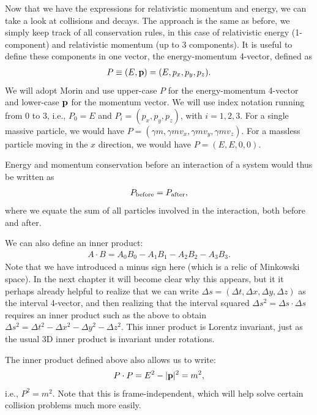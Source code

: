 \documentclass[12pt]{article}
\newcommand{\be}{\begin{eqnarray}}
\newcommand{\ee}{\end{eqnarray}}
\begin{document}
Now that we have the expressions for relativistic momentum and energy, we can take a look at collisions and decays.  The approach is the same as before, we simply keep track of all conservation rules, in this case of relativistic energy (1-component) and relativistic momentum (up to 3 components). It is useful to define these components in one vector, the energy-momentum 4-vector, defined as 
\be
P \equiv (E, {\bf p}) = (E,p_x, p_y, p_z).
\ee
We will adopt Morin and use upper-case $P$ for the energy-momentum 4-vector and lower-case ${\bf p}$ for the momentum vector. We will use index notation running from $0$ to $3$, i.e., $P_0 = E$ and $P_i = (p_x, p_y, p_z)$, with $i=1,2,3$. For a single massive particle, we would have $P=(\gamma m,\gamma mv_x, \gamma m v_y, \gamma m v_z)$. For a massless particle moving in the $x$ direction, we would have $P=(E,E,0,0)$. 

Energy and momentum conservation before an interaction of a system would thus be written as 
\be
P_{\rm before} = P_{\rm after},
\ee
where we equate the sum of all particles involved in the interaction, both before and after. 

We can also define an inner product:
\be
A\cdot B = A_0 B_0 - A_1 B_1 - A_2 B_2 -A_3 B_3. 
\ee
Note that we have introduced a minus sign here (which is a relic of Minkowski space). In the next chapter it will become clear why this appears, but it it perhaps already helpful to realize that we can write $\Delta s = (\Delta t, \Delta x, \Delta y, \Delta z)$ as the interval 4-vector, and then realizing that the interval squared $\Delta s^2 = \Delta s \cdot \Delta s$ requires an inner product such as the above to obtain $\Delta s^2 = \Delta t^2 - \Delta x^2 - \Delta y^2 - \Delta z^2$. This inner product is Lorentz invariant, just as the usual 3D inner product is invariant under rotations. 

The inner product defined above also allows us to write:
\be
P \cdot P = E^2 - |{\bf p}|^2 = m^2,
\ee
i.e., $P^2 = m^2$. Note that this is frame-independent, which will help solve certain collision problems much more easily. 
\end{document}
